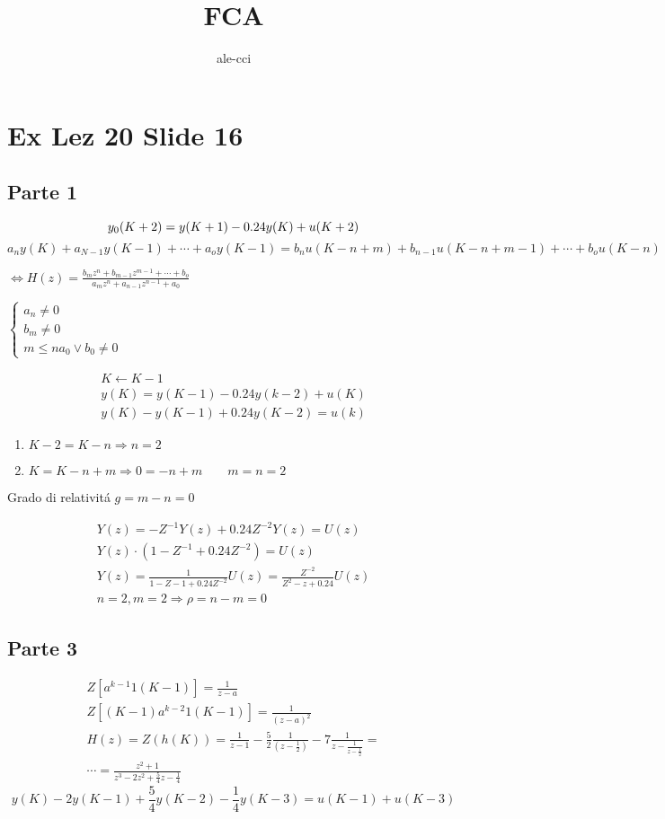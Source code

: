 \documentclass{article}
\title{FCA}
\author{ale-cci}
\begin{document}
\maketitle
\newpage
\section{Ex Lez 20 Slide 16}

\subsection{Parte 1}

\[
    y_0(K+2) = y(K+1) - 0.24y(K) + u(K+2)\\
\]
\bigbreak
\(
    a_ny(K) + a_{N-1}y(K-1) + \cdots +a_o y(K-1) = b_n u(K-n +m) + b_{n-1} u(K-n+m-1) + \cdots + b_o u(K-n)
\)

\(
\Leftrightarrow H(z) = \frac{b_mz^{n} + b_{m-1}z^{m-1}+ \cdots + b_o}{a_mz^n + a_{n-1}z^{n-1}+a_0}
\)
\bigbreak

\(
\begin{cases}
a_n \neq 0\\
b_m \neq 0 \\
m \le n
a_0 \lor b_0 \neq 0
\end{cases}
\)

\[
\begin{split}
K \leftarrow K-1\\
y(K) = y(K-1) - 0.24 y(k-2) + u(K)\\
y(K) - y(K-1) + 0.24 y(K-2) = u(k)
\end{split}
\]

\begin{enumerate}
    \item $K-2 = K - n \Rightarrow n = 2$
    \item $K = K - n + m \Rightarrow 0 = -n + m \qquad m = n = 2$
\end{enumerate}


Grado di relativit\'a $g = m-n = 0$

\[
\begin{split}
Y(z) = -Z^{-1} Y(z) + 0.24 Z^{-2} Y(z) = U(z)\\
Y(z) \cdot (1-Z^{-1} + 0.24 Z^{-2}) =  U(z)\\
Y(z) = \frac{1}{1-Z-1 + 0.24 Z^{-2}}U(z) = \frac{Z^{-2}}{Z^2 - z + 0.24} U(z)\\
n = 2, m=2 \Rightarrow \rho = n - m = 0
\end{split}
\]

\subsection{Parte 3}
\[
\begin{split}
    Z[ a^{k-1} 1(K-1)] = \frac{1}{z-a}\\
    Z[ (K-1) a^{k-2} 1(K-1)] = \frac{1}{(z-a)^2}\\
    H(z) = Z(h(K)) = \frac{1}{z-1} -
    \frac{5}{2} \frac{1}{\left( z - \frac{1}{2}\right)} - 7 \frac{1}{z-\frac{1}{z - \frac{1}{2}}} = \\
    \cdots = \frac{z^2 +1}{z^3 -2z^2 + \frac{5}{4} z - \frac{1}{4}}
\end{split}
\]
\[
    y(K) - 2y(K-1) + \frac{5}{4}y(K-2) - \frac{1}{4}y(K-3) = u(K-1) + u(K-3)
\]
\end{document}

